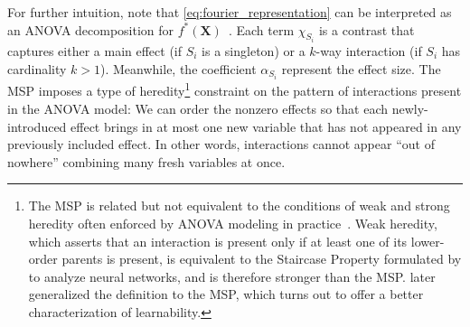 \documentclass[11pt]{article}
\newcommand{\bX}{\mathbf{X}}
\newcommand{\MSP}{\textsf{MSP}}
\newcommand{\comment}[2]{{#2}}
\begin{document}
\comment{red}{For further intuition, note that \eqref{eq:fourier_representation} can be interpreted as an ANOVA decomposition for $f^*(\bX)$~\citep{wahba1990spline}. 
Each term $\chi_{S_i}$ is a contrast that captures either a main effect (if $S_i$ is a singleton) or a $k$-way interaction (if $S_i$ has cardinality $k > 1$). 
Meanwhile, the coefficient $\alpha_{S_i}$ represent the effect size.
The \textsf{MSP} imposes a type of heredity\footnote{\comment{red}{The \textsf{MSP} is related but not equivalent to the conditions of weak and strong heredity often enforced by ANOVA modeling in practice~\citep{wu2011experiments}. Weak heredity, which asserts that an interaction is present only if at least one of its lower-order parents is present, is equivalent to the Staircase Property formulated by \cite{abbe2021staircase} to analyze neural networks, and is therefore stronger than the \MSP. \cite{abbe2021staircase} later generalized the definition to the \MSP, which turns out to offer a better characterization of learnability.}} constraint on the pattern of interactions present in the ANOVA model: We can order the nonzero effects so that each newly-introduced effect brings in at most one new variable that has not appeared in any previously included effect.
In other words, interactions cannot appear ``out of nowhere'' combining many fresh variables at once.}
\end{document}
